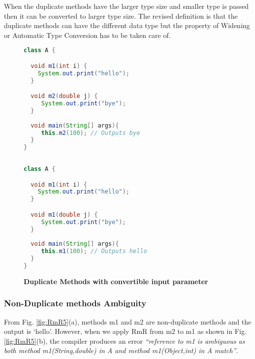 When the duplicate methods have the larger type size and smaller type is passed then it can be converted to larger type size. The revised definition is that the duplicate methods can have the different data type but the property of Widening or Automatic Type Conversion has to be taken care of.

\begin{figure}[th]
\centering
\begin{minipage}[t]{0.7\linewidth}
\begin{lstlisting}[language=java, basicstyle=\scriptsize\ttfamily,frame=single]
class A {

  void m1(int i) {	
    System.out.print("hello");
  }

  void m2(double j) {	
     System.out.print("bye");
  }	
  
  void main(String[] args){
     this.m2(100); // Outputs bye
  }
}
 
\end{lstlisting}
\end{minipage}
\hfill
\begin{minipage}[t]{0.7\linewidth}
\begin{lstlisting}[language=java, basicstyle=\scriptsize\ttfamily,frame=single]
class A {

  void m1(int i) {	
    System.out.print("hello");
  }

  void m1(double j) {	
     System.out.print("bye");
  }	
  
  void main(String[] args){
     this.m1(100); // Outputs hello
  }
}

\end{lstlisting}
\end{minipage}
\caption{\textbf{Duplicate Methods with convertible input parameter}}
\label{fig:RmR4}
\end{figure}

\subsubsection {Non-Duplicate methods Ambiguity} 
From Fig. \ref{fig:RmR5}(a), methods m1 and m2 are non-duplicate methods and the output is `hello'. However, when we apply RmR from m2 to m1 as shown in Fig. \ref{fig:RmR5}(b), the compiler produces an error \textsl{``reference to m1 is ambiguous as both method m1(String,double) in A and method m1(Object,int) in A match''}. 


